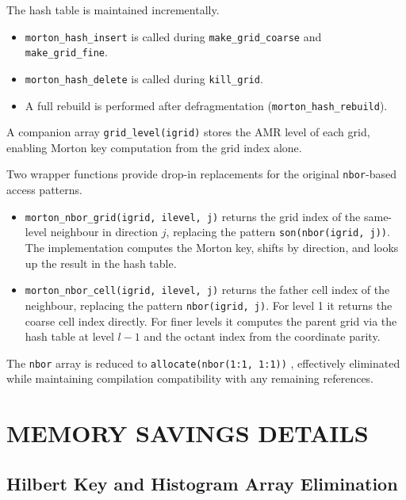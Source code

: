 \documentclass[fleqn,usenatbib]{mnras}
\newcommand{\code}[1]{\texttt{#1}}
\begin{document}
The hash table is maintained incrementally.
\begin{itemize}
\item \code{morton\_hash\_insert} is called during \code{make\_grid\_coarse} and \code{make\_grid\_fine}.
\item \code{morton\_hash\_delete} is called during \code{kill\_grid}.
\item A full rebuild is performed after defragmentation (\code{morton\_hash\_rebuild}).
\end{itemize}

A companion array \code{grid\_level(igrid)} stores the AMR level of
each grid, enabling Morton key computation from the grid index alone.

Two wrapper functions provide drop-in replacements for the original
\code{nbor}-based access patterns.

\begin{itemize}
\item \code{morton\_nbor\_grid(igrid, ilevel, j)} returns the grid
  index of the same-level neighbour in direction $j$, replacing the
  pattern \code{son(nbor(igrid, j))}. The implementation computes the
  Morton key, shifts by direction, and looks up the result in the hash table.

\item \code{morton\_nbor\_cell(igrid, ilevel, j)} returns the father
  cell index of the neighbour, replacing the pattern
  \code{nbor(igrid, j)}. For level 1 it returns the coarse cell index
  directly. For finer levels it computes the parent grid via the
  hash table at level $l-1$ and the octant index from the coordinate
  parity.
\end{itemize}

The \code{nbor} array is reduced to \code{allocate(nbor(1:1, 1:1))}
, effectively eliminated while maintaining compilation compatibility
with any remaining references.





\section{MEMORY SAVINGS DETAILS}
\label{app:memory}

\subsection{Hilbert Key and Histogram Array Elimination}
\label{app:mem_hilbert}
\end{document}
